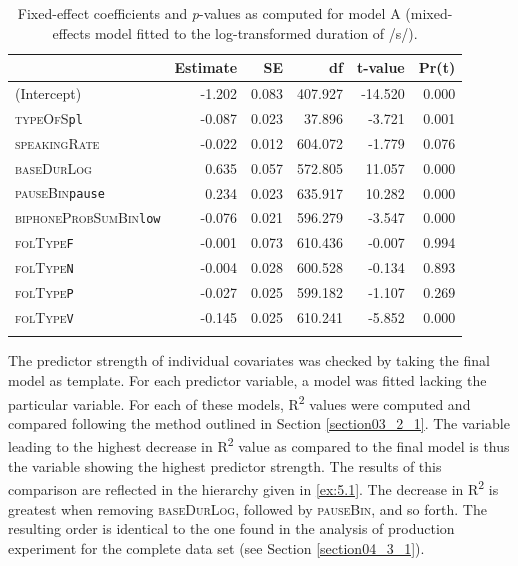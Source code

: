 \begin{table}\fontsize{10}{11}
\caption{Fixed-effect coefficients and \textit{p}-values as computed for model A (mixed-effects model fitted to the log-transformed duration of /s/).}
\label{tab:5.7}
\centering
\begin{tabular}{lrrrrr} 
\lsptoprule
~                    & Estimate & SE    & df      & t-value & Pr(\textbar{}t\textbar{})  \\ 
\midrule
(Intercept)          & -1.202   & 0.083 & 407.927 & -14.520 & 0.000                      \\
\textsc{typeOfS}\texttt{pl}            & -0.087   & 0.023 & 37.896  & -3.721  & 0.001                      \\
\textsc{speakingRate}         & -0.022   & 0.012 & 604.072 & -1.779  & 0.076                      \\
\textsc{baseDurLog}           & 0.635    & 0.057 & 572.805 & 11.057  & 0.000                      \\
\textsc{pauseBin}\texttt{pause}        & 0.234    & 0.023 & 635.917 & 10.282  & 0.000                      \\
\textsc{biphoneProbSumBin}\texttt{low} & -0.076   & 0.021 & 596.279 & -3.547  & 0.000                      \\
\textsc{folType}\texttt{F}             & -0.001   & 0.073 & 610.436 & -0.007  & 0.994                      \\
\textsc{folType}\texttt{N}             & -0.004   & 0.028 & 600.528 & -0.134  & 0.893                      \\
\textsc{folType}\texttt{P}             & -0.027   & 0.025 & 599.182 & -1.107  & 0.269                      \\
\textsc{folType}\texttt{V}             & -0.145   & 0.025 & 610.241 & -5.852  & 0.000                      \\
\lspbottomrule
\end{tabular}
\end{table}

The predictor strength of individual covariates was checked by taking the final model as template. For each predictor variable, a model was fitted lacking the particular variable. For each of these models, R\textsuperscript{2} values were computed and compared following the method outlined in Section \ref{section03_2_1}. The variable leading to the highest decrease in R\textsuperscript{2} value as compared to the final model is thus the variable showing the highest predictor strength. The results of this comparison are reflected in the hierarchy given in \ref{ex:5.1}. The decrease in R\textsuperscript{2} is greatest when removing \textsc{baseDurLog}, followed by \textsc{pauseBin}, and so forth. The resulting order is identical to the one found in the analysis of production experiment for the complete data set (see Section \ref{section04_3_1}).

